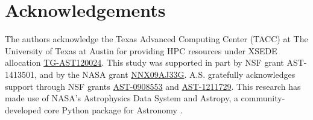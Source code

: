 \section*{Acknowledgements}
The authors acknowledge the Texas Advanced Computing Center (TACC) at The University of Texas at Austin for providing HPC resources under XSEDE allocation \underline{TG-AST120024}. This study was supported in part by NSF grant AST-1413501, and by the NASA grant  \underline{NNX09AJ33G}. A.S. gratefully acknowledges support through NSF grants \underline{AST-0908553} and  \underline{AST-1211729}. This research has made use of NASA's Astrophysics Data System and Astropy, a community-developed core Python package for Astronomy \citep{Robitailleetal2013}.